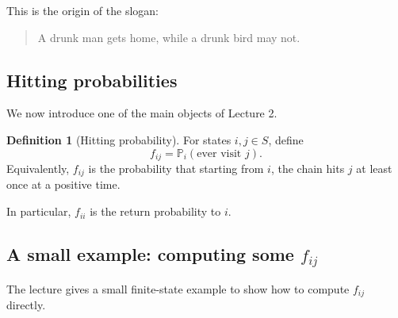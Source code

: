 \documentclass[11pt]{article}
\theoremstyle{definition}
\newtheorem{definition}[theorem]{Definition}
\begin{document}
This is the origin of the slogan:

\begin{quote}
A drunk man gets home, while a drunk bird may not.
\end{quote}

\subsection{Hitting probabilities}

We now introduce one of the main objects of Lecture 2.

\begin{definition}[Hitting probability]
For states \(i,j\in S\), define
\[
f_{ij}=\mathbb P_i(\text{ever visit } j).
\]
Equivalently, \(f_{ij}\) is the probability that starting from \(i\), the chain hits \(j\) at least once at a positive time.
\end{definition}

In particular, \(f_{ii}\) is the return probability to \(i\).

\subsection{A small example: computing some \texorpdfstring{$f_{ij}$}{fij}}

The lecture gives a small finite-state example to show how to compute \(f_{ij}\) directly.

\begin{center}
\end{center}
\end{document}

